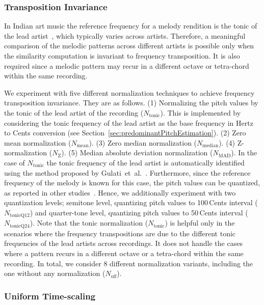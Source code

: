 \subsubsection{Transposition Invariance}

In Indian art music the reference frequency for a melody rendition is the tonic of the lead artist~\cite{Gulati2014Tonic}, which typically varies across artists. Therefore, a meaningful comparison of the melodic patterns across different artists is possible only when the similarity computation is invariant to frequency transposition. It is also required since a melodic pattern may recur in a different octave or tetra-chord within the same recording. 

We experiment with five different normalization techniques to achieve frequency transposition invariance. They are as follows. (1) Normalizing the pitch values by the tonic of the lead artist of the recording ($N_{\mathrm{tonic}}$). This is implemented by considering the tonic frequency of the lead artist as the base frequency in Hertz to Cents conversion (see Section~\ref{sec:predominantPitchEstimation}). (2) Zero mean normalization ($N_{\mathrm{mean}}$). (3) Zero median normalization ($N_{\mathrm{median}}$). (4) Z-normalization ($N_{\mathrm{Z}}$). (5) Median absolute deviation normalization ($N_{\mathrm{MAD}}$). In the case of $N_{\mathrm{tonic}}$ the tonic frequency of the lead artist is automatically identified using the method proposed by Gulati~et~al.~\cite{Gulati2014Tonic}. Furthermore, since the reference frequency of the melody is known for this case, the pitch values can be quantized, as reported in other studies~\cite{Ross2012b}. Hence, we additionally experiment with two quantization levels; semitone level, quantizing pitch values to 100\,Cents interval ($N_{\mathrm{tonicQ12}}$) and quarter-tone level,  quantizing pitch values to 50\,Cents interval ($N_{\mathrm{tonicQ24}}$). Note that the tonic normalization ($N_{\mathrm{tonic}}$) is helpful only in the scenarios where the frequency transpositions are due to the different tonic frequencies of the lead artists across recordings. It does not handle the cases where a pattern recurs in a different octave or a tetra-chord within the same recording. In total, we consider 8 different normalization variants, including the one without any normalization ($N_{\mathrm{off}}$). 

\subsubsection{Uniform Time-scaling}

